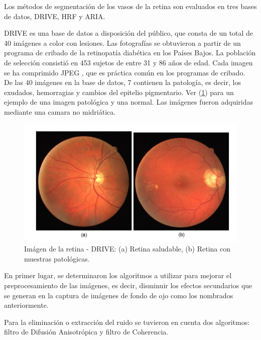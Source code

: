 Los m\'etodos de segmentaci\'on de los vasos de la retina son evaluados en tres bases de datos, DRIVE, HRF y ARIA.

DRIVE es una base de datos a disposici\'on del p\'ublico, que consta de un total de 40 im\'agenes a color con lesiones. Las fotograf\'ias se obtuvieron a partir de un programa de cribado de la retinopat\'ia diab\'etica en los Pa\'ises Bajos.
La poblaci\'on de selecci\'on consisti\'o en 453 sujetos de entre 31 y 86 a\~nos de edad. Cada imagen se ha comprimido JPEG , que es pr\'actica com\'un en los programas de cribado.\\
De las 40 im\'agenes en la base de datos, 7 contienen la patolog\'ia, es decir, los exudados, hemorragias y cambios del epitelio pigmentario. Ver (\ref{fig:Drive_images_retinal}) para un ejemplo de una imagen patol\'ogica y  una normal. Las im\'agenes fueron adquiridas mediante una camara no midri\'atica.\\

\begin{figure}[H]
	{
	\centering
	\includegraphics[width=1\textwidth]{Figures/Drive_images_retinal}
	\caption[Drive]{Im\'agen de la retina - DRIVE: (a) Retina saludable, (b) Retina con muestras patol\'ogicas.}
	\label{fig:Drive_images_retinal}
	}
\end{figure}	



En primer lugar, se determinaron los algoritmos a utilizar para mejorar el preprocesamiento de las im\'agenes, es decir, disminuir los efectos secundarios que se generan en la captura de im\'agenes de fondo de ojo como los nombrados anteriormente. 

Para la eliminaci\'on o extracci\'on del ruido se tuvieron en cuenta dos algoritmos: filtro de Difusi\'on Anisotr\'opica y filtro de  Coherencia.\\

